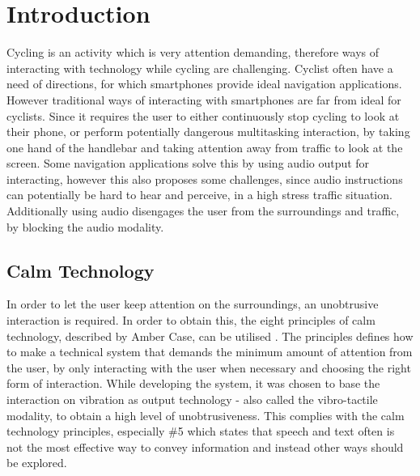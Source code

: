 \documentclass{sigchi}
\begin{document}


\section{Introduction}
Cycling is an activity which is very attention demanding, therefore ways of interacting with technology while cycling are challenging. Cyclist often have a need of directions, for which smartphones provide ideal navigation applications. However traditional ways of interacting with smartphones are far from ideal for cyclists. Since it requires the user to either continuously stop cycling to look at their phone, or perform potentially dangerous multitasking interaction, by taking one hand of the handlebar and taking attention away from traffic to look at the screen. 
\newline
\newline
Some navigation applications solve this by using audio output for interacting, however this also proposes some challenges, since audio instructions can potentially be hard to hear and perceive, in a high stress traffic situation. Additionally using audio disengages the user from the surroundings and traffic, by blocking the audio modality.
\subsection{Calm Technology}
In order to let the user keep attention on the surroundings, an unobtrusive interaction is required. In order to obtain this, the eight principles of calm technology, described by Amber Case, can be utilised \cite{case15}. The principles  defines how to make a technical system that demands the minimum amount of attention from the user, by only interacting with the user when necessary and choosing the right form of  interaction.  
\newline
\newline 
While developing the system, it was chosen to base the interaction on vibration as output technology - also called the vibro-tactile modality, to obtain a high level of unobtrusiveness. This complies with the calm technology principles, especially  \#5 which states that speech and text often is not the most effective way to convey information and instead other ways should be explored.
\end{document}
